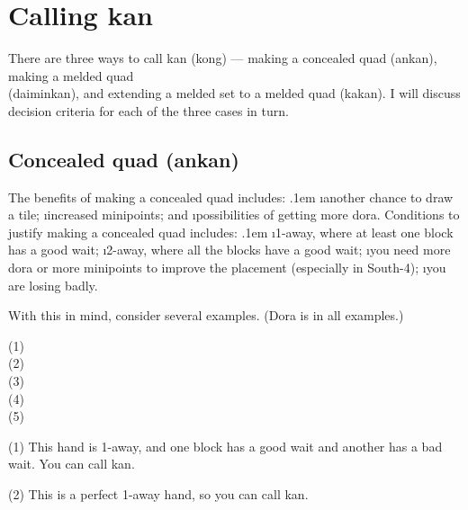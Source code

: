 \newpage

\section{Calling {\jap kan}} \label{sec:kong}  

There are three ways to call {\jap kan} (kong) --- making a concealed quad ({\jap ankan}), making a melded quad \\({\jap daiminkan}), and extending a melded set to a melded quad ({\jap kakan}). I will discuss decision criteria for each of the three cases in turn.

\subsection{Concealed quad ({\jap ankan})}
The benefits of making a concealed quad includes:
\bi \itemsep.1em
\i another chance to draw a tile;
\i increased minipoints; and
\i possibilities of getting more {\jap dora}.
\ei
Conditions to justify making a concealed quad includes:
\bi \itemsep.1em
\i 1-away, where at least one block has a good wait;
\i 2-away, where all the blocks have a good wait;
\i you need more {\jap dora} or more minipoints to improve the placement (especially in South-4);
\i you are losing badly.
\ei

With this in mind, consider several examples. ({\jap Dora} is {\large\xi} in all examples.)

\bp
{\small (1)}
\bei\bei\bei\bei\\
{\small (2)}
\bei\bei\bei\bei\\
{\small (3)}
\bei\bei\bei\bei\\
{\small (4)}
\bei\bei\bei\bei\bai\\
{\small (5)}
\bei\bei\bei\bei\bai\bai\\
\ep

\noindent (1) This hand is 1-away, and one block has a good wait and another has a bad wait. You can call {\jap kan}. 

\noindent (2) This is a perfect 1-away hand, so you can call {\jap kan}.

